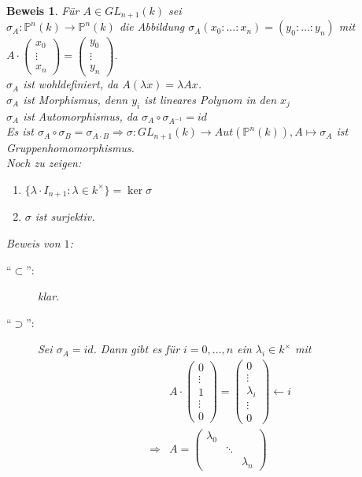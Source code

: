 \documentclass[a4paper,12pt]{report}
\theoremstyle{break}
\theoremstyle{nonumberbreak}
\theoremstyle{nonumberplain}
\newtheorem{Bew}{Beweis}
\begin{document}
\begin{Bew}
Für $A \in GL_{n+1}(k)$ sei\\ $\sigma_A: \mathbb P^n(k) \to \mathbb{P}^n(k)$ die Abbildung $\sigma_A(x_0 : \dots : x_n) = (y_0 : \dots : y_n )$ mit $A\cdot \begin{pmatrix} x_0\\\vdots\\x_n \end{pmatrix} = \begin{pmatrix} y_0\\ \vdots \\ y_n \end{pmatrix}$.\\
$\sigma_A$ ist wohldefiniert, da $A(\lambda x) = \lambda Ax$.\\
$\sigma_A$ ist Morphismus, denn $y_i$ ist lineares Polynom in den $x_j$\\
$\sigma_A$ ist Automorphismus, da $\sigma_A \circ \sigma_{A^{-1}} = id$\\
Es ist $\sigma_A \circ \sigma_B = \sigma_{A\cdot B} \Rightarrow \sigma: GL_{n+1}(k) \to Aut(\mathbb P^n(k)), A\mapsto \sigma_A$ ist Gruppenhomomorphismus.\\
Noch zu zeigen:
\begin{enumerate}[label=\arabic{*}.]
\item $\{ \lambda \cdot I_{n+1} : \lambda \in k^\times \} = \ker{\sigma}$
\item $\sigma$ ist surjektiv.
\end{enumerate}
Beweis von $1$:
\begin{description}
\item ["`$\subset$"':] klar.
\item ["`$\supset$"':] Sei $\sigma_A = id$. Dann gibt es für $i = 0, \dots, n$ ein $\lambda_i \in k^\times$ mit
\begin{align*}
& A \cdot \begin{pmatrix} 0\\\vdots\\ 1 \\ \vdots\\ 0 \end{pmatrix} = \begin{pmatrix} 0\\ \vdots\\ \lambda_i \\ \vdots \\ 0 \end{pmatrix} \leftarrow i\\
\Rightarrow & A = \begin{pmatrix} \lambda_0 & & \\ & \ddots & \\ & & \lambda_n \end{pmatrix}\\

\end{align*}
\end{description}
\end{Bew}
\end{document}
